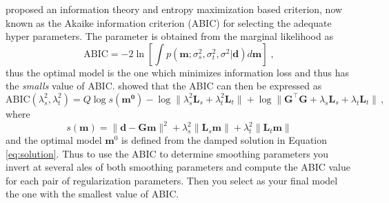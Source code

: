 \citet{akaike1980} proposed an information theory and entropy maximization based criterion, now known as the Akaike information criterion (ABIC) for selecting the adequate hyper parameters. The parameter is obtained from the marginal likelihood as
\begin{equation}
\label{eq:abic}
\mathrm{ABIC}=-2\ln\left[\int p(\mathbf{m};\sigma_s^2,\sigma_t^2,\sigma^2|\mathbf{d})d\mathbf{m}\right]\;,
\end{equation}
thus the optimal model is the one which minimizes information loss and thus has the \textit{smalls} value of ABIC. \citet{fukahata2004} showed that the ABIC can then be expressed as
\begin{equation}
\label{eq:abic_total}
\mathrm{ABIC}(\lambda_s^2,\lambda^2_t)=Q\log s(\mathbf{m^0})-\log\|\lambda^2_s\mathbf{L}_s+\lambda_t^2\mathbf{L}_t\|+\log\|\mathbf{G}^\top\mathbf{G}+\lambda_s\mathbf{L}_s+\lambda_t\mathbf{L}_t\|\,,
\end{equation}
where 
\begin{equation}
s(\mathbf{m})=\|\mathbf{d}-\mathbf{Gm}\|^2+\lambda_s^2\|\mathbf{L}_s\mathbf{m}\|+\lambda_t^2\|\mathbf{L}_t\mathbf{m}\|
\end{equation}
and the optimal model $\mathbf{m}^0$ is defined from the damped solution in Equation \ref{eq:solution}. Thus to use the ABIC to determine smoothing parameters you invert at several ales of both smoothing parameters and compute the ABIC value for each pair of regularization parameters. Then you select as your final model the one with the smallest value of ABIC.



